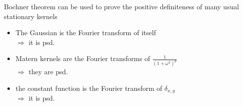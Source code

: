 \begin{frame}{}
Bochner theorem can be used to prove the positive definiteness of many usual stationary kernels \vspace{2mm}
\begin{itemize}
  \item The Gaussian is the Fourier transform of itself \\
  \qquad $\Rightarrow$ it is psd.
  \item Matern kernels are the Fourier transforms of $\frac{1}{(1+\omega^2)^p}$ \\
  \qquad $\Rightarrow$ they are psd.
  \item the constant function is the Fourier transform of $\delta_{x,y}$ \\
  \qquad $\Rightarrow$ it is psd.
\end{itemize} \vspace{5mm}
\end{frame}

